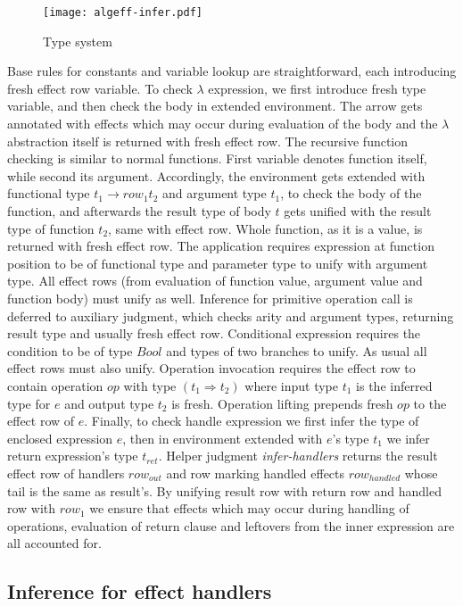 \documentclass[inz, english, shortabstract]{iithesis}
\begin{document}
\begin{figure}
  \centering
  \texttt{[image: algeff-infer.pdf]}
  \caption{Type system} 
  \label{fig:algeff-infer} 
\end{figure}

Base rules for constants and variable lookup are straightforward, each introducing fresh effect row variable.
To check $ \lambda $ expression, we first introduce fresh type variable, and then check the body in extended environment.
The arrow gets annotated with effects which may occur during evaluation of the body and the $ \lambda $ abstraction itself is returned with fresh effect row.
The recursive function checking is similar to normal functions.
First variable denotes function itself, while second its argument.
Accordingly, the environment gets extended with functional type $ t_1 \rightarrow row_1 t_2 $ and argument type $ t_1 $, to check the body of the function, and afterwards the result type of body $ t $ gets unified with the result type of function $ t_2 $, same with effect row.
Whole function, as it is a value, is returned with fresh effect row.
The application requires expression at function position to be of functional type and parameter type to unify with argument type.
All effect rows (from evaluation of function value, argument value and function body) must unify as well.
Inference for primitive operation call is deferred to auxiliary judgment, which checks arity and argument types, returning result type and usually fresh effect row.
Conditional expression requires the condition to be of type $ Bool $ and types of two branches to unify.
As usual all effect rows must also unify.
Operation invocation requires the effect row to contain operation $ op $ with type $ (t_1 \Rightarrow t_2) $ where input type $ t_1 $ is the inferred type for $ e $ and output type $ t_2 $ is fresh.
Operation lifting prepends fresh $ op $ to the effect row of $ e $.
Finally, to check handle expression we first infer the type of enclosed expression $ e $, then in environment extended with $e$'s type $ t_1 $ we infer return expression's type $ t_{ret} $.
Helper judgment \textit{infer-handlers} returns the result effect row of handlers $ row_{out} $ and row marking handled effects $ row_{handled} $ whose tail is the same as result's.
By unifying result row with return row and handled row with $ row_1 $ we ensure that effects which may occur during handling of operations, evaluation of return clause and leftovers from the inner expression are all accounted for.

\subsection{Inference for effect handlers}
\end{document}
